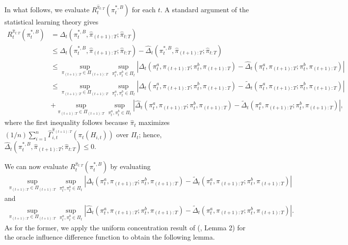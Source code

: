 In what follows, we evaluate $R_{t}^{\hat{\pi}_{t:T}}(\pi_{t}^{\ast,B})$ for each $t$. 
A standard argument of the statistical learning theory  \citep[e.g.,][]{Lugosi_2002} gives
\begin{align}
    R_{t}^{\hat{\pi}_{t:T}}(\pi_{t}^{\ast,B})  
    &=\Delta_{t}\left(\pi_{t}^{\ast,B},\hat{\pi}_{(t+1):T};\hat{\pi}_{t:T}\right) 
    \nonumber\\
    &\leq \Delta_{t}\left(\pi_{t}^{\ast,B},\hat{\pi}_{(t+1):T};\hat{\pi}_{t:T}\right) - \widehat{\Delta}_{t}\left(\pi_{t}^{\ast,B},\hat{\pi}_{(t+1):T};\hat{\pi}_{t:T}\right) \nonumber \\
    &\leq 
    \sup_{\pi_{(t+1):T} \in \Pi_{(t+1):T}} \sup_{\pi_{t}^{a},\pi_{t}^{b} \in \Pi_{t}} |\Delta_{t}(\pi_{t}^{a},\pi_{(t+1):T};\pi_{t}^{b},\pi_{(t+1):T}) - \widehat{\Delta}_{t}(\pi_{t}^{a},\pi_{(t+1):T};\pi_{t}^{b},\pi_{(t+1):T})| \nonumber \\
    & \leq  \sup_{\pi_{(t+1):T} \in \Pi_{(t+1):T}} \sup_{\pi_{t}^{a},\pi_{t}^{b} \in \Pi_{t}}|\Delta_{t}(\pi_{t}^{a},\pi_{(t+1):T};\pi_{t}^{b},\pi_{(t+1):T}) - \widetilde{\Delta}_{t}(\pi_{t}^{a},\pi_{(t+1):T};\pi_{t}^{b},\pi_{(t+1):T})| \nonumber \\
    &    + \sup_{\pi_{(t+1):T} \in \Pi_{(t+1):T}} \sup_{\pi_{t}^{a},\pi_{t}^{b} \in \Pi_{t}} |\widehat{\Delta}_{t}(\pi_{t}^{a},\pi_{(t+1):T};\pi_{t}^{b},\pi_{(t+1):T}) - \widetilde{\Delta}_{t}(\pi_{t}^{a},\pi_{(t+1):T};\pi_{t}^{b},\pi_{(t+1):T})|, \label{eq:standard_inequality}
\end{align}
where the first inequality follows because $\hat{\pi}_{t}$ maximizes  $(1/n)\sum_{i=1}^{n} \widehat{\Gamma}_{i,t}^{\hat{\pi}_{(t+1):T}}\left(\pi_{t}(H_{i,t})\right)$ over $\Pi_t$; hence, $\widehat{\Delta}_{t}\left(\pi_{t}^{\ast,B},\hat{\pi}_{(t+1):T};\hat{\pi}_{t:T}\right) \leq 0$. 

We can now evaluate $R_{t}^{\hat{\pi}_{t:T}}(\pi_{t}^{\ast,B})$ by evaluating
\begin{align}
  \sup_{\pi_{(t+1):T} \in \Pi_{(t+1):T}} \sup_{\pi_{t}^{a},\pi_{t}^{b} \in \Pi_{t}} |\Delta_{t}(\pi_{t}^{a},\pi_{(t+1):T};\pi_{t}^{b},\pi_{(t+1):T}) - \widetilde{\Delta}_{t}(\pi_{t}^{a},\pi_{(t+1):T};\pi_{t}^{b},\pi_{(t+1):T})|  
  \label{eq:former}
\end{align}
and 
\begin{align}
    \sup_{\pi_{(t+1):T} \in \Pi_{(t+1):T}} \sup_{\pi_{t}^{a},\pi_{t}^{b} \in \Pi_{t}} |\widehat{\Delta}_{t}(\pi_{t}^{a},\pi_{(t+1):T};\pi_{t}^{b},\pi_{(t+1):T}) - \widetilde{\Delta}_{t}(\pi_{t}^{a},\pi_{(t+1):T};\pi_{t}^{b},\pi_{(t+1):T})|.
    \label{eq:latter}
\end{align}
As for the former, we apply the uniform concentration result of \citeauthor{zhou2022offline} (\citeyear{zhou2022offline}, Lemma 2) for the oracle influence difference function to obtain the following lemma.


